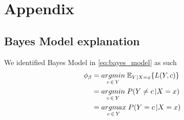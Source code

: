 \section{Appendix}
\subsection{Bayes Model explanation}
We identified Bayes Model in \autoref{eq:bayes_model} as such
\begin{align}
\phi_{\beta} & = \underset{c \,\in\, Y}{argmin} \; \mathbb{E}_{Y|X=x}\{L(Y,c) \} \notag\\
			 & = \underset{c \,\in\, Y}{argmin} \; P(Y \neq c \,| X = x) \notag\\
			 & = \underset{c \,\in\, Y}{argmax} \; P(Y = c \,| X = x)\notag
\end{align}

